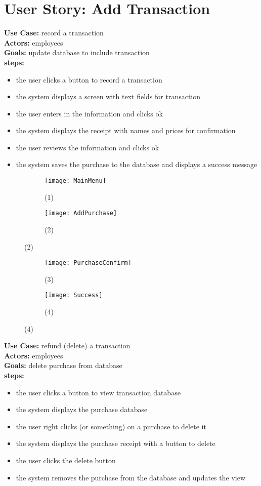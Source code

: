 \documentclass[notitlepage,11pt]{article}
\begin{document}
\section{User Story: Add Transaction}
	\textbf{Use Case:} record a transaction\\
	\textbf{Actors:} employees\\
	\textbf{Goals:} update database to include transaction\\
	\textbf{steps:}
	\begin{itemize}
		\item[(1)] the user clicks a button to record a transaction
		\item[(2)] the system displays a screen with text fields for transaction
		\item the user enters in the information and clicks ok
		\item[(3)] the system displays the receipt with names and prices for confirmation
		\item the user reviews the information and clicks ok
		\item[(4)] the system saves the purchase to the database and displays a success message
	\end{itemize}
\begin{figure}[h]
	\begin{subfigure}{.5\textwidth}
	\centering
	\texttt{[image: MainMenu]}
	\caption{(1)}
	\end{subfigure}%
	\begin{subfigure}{.5\textwidth}
	\centering
	\texttt{[image: AddPurchase]}
	\caption{(2)}
	\end{subfigure}
\end{figure}
\begin{figure}[h]
	\begin{subfigure}{.5\textwidth}
	\centering
	\texttt{[image: PurchaseConfirm]}
	\caption{(3)}
	\end{subfigure}%
	\begin{subfigure}{.5\textwidth}
	\centering
	\texttt{[image: Success]}
	\caption{(4)}
	\end{subfigure}
\end{figure}
	\textbf{Use Case:} refund (delete) a transaction\\
	\textbf{Actors:} employees\\
	\textbf{Goals:} delete purchase from database\\
	\textbf{steps:}
	\begin{itemize}
		\item[(1)] the user clicks a button to view transaction database
		\item[(2)] the system displays the purchase database
		\item the user right clicks (or something) on a purchase to delete it
		\item[(3)] the system displays the purchase receipt with a button to delete
		\item the user clicks the delete button
		\item[(2)] the system removes the purchase from the database and updates the view
	\end{itemize}
\end{document}
